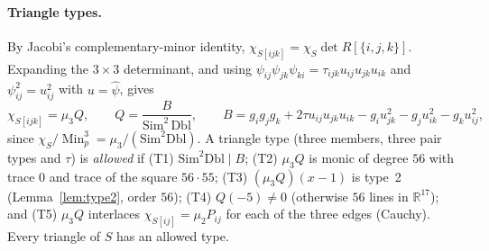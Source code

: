 \documentclass[11pt]{article}
\theoremstyle{definition}
\newcommand{\R}{\mathbb{R}}
\newcommand{\Min}{\operatorname{Min}}
\begin{document}
\paragraph{Triangle types.} By Jacobi's complementary-minor identity,
$\chi_{S[ijk]}=\chi_S\det R[\{i,j,k\}]$. Expanding the $3\times3$ determinant, and using
$\psi_{ij}\psi_{jk}\psi_{ki}=\tau_{ijk}u_{ij}u_{jk}u_{ik}$ and $\psi_{ij}^2=u_{ij}^2$ with
$u=\widehat\psi$, gives
\[
\chi_{S[ijk]}=\mu_3Q,\qquad Q=\frac{B}{\mathrm{Sim}^2\,\mathrm{Dbl}},\qquad
B=g_ig_jg_k+2\tau u_{ij}u_{jk}u_{ik}-g_iu_{jk}^2-g_ju_{ik}^2-g_ku_{ij}^2,
\]
since $\chi_S/\Min_p^3=\mu_3/(\mathrm{Sim}^2\mathrm{Dbl})$. A triangle type (three members, three pair
types and $\tau$) is \emph{allowed} if (T1) $\mathrm{Sim}^2\mathrm{Dbl}\mid B$; (T2) $\mu_3Q$ is monic of
degree $56$ with trace $0$ and trace of the square $56\cdot55$; (T3) $(\mu_3Q)(x-1)$ is type~2
(Lemma~\ref{lem:type2}, order $56$); (T4) $Q(-5)\ne0$ (otherwise $56$ lines in $\R^{17}$); and (T5)
$\mu_3Q$ interlaces $\chi_{S[ij]}=\mu_2P_{ij}$ for each of the three edges (Cauchy). Every triangle
of $S$ has an allowed type.
\end{document}
